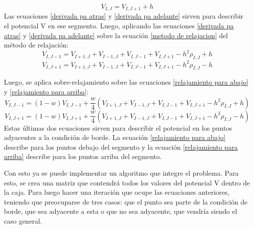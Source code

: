 \documentclass[letterpaper,oneside]{article}
\begin{document}
\begin{equation}
V_{I,J} =V_{I,J+1}+ h
\label{derivada pa adelante}
\end{equation}
Las ecuaciones \ref{derivada pa atras} y \ref{derivada pa adelante} sirven para describir el potencial V en ese segmento. Luego, aplicando las ecuaciones \ref{derivada pa atras} y \ref{derivada pa adelante} sobre la ecuación \ref{metodo de relajacion} del método de relajación:
\begin{equation}
 V_{I,J-1} = V_{I+1,J}+V_{I-1,J}+V_{I,J-1}+V_{I,J+1} - h^2\rho_{I,J} + h
 \label{relajamiento para abajo}
\end{equation}
\begin{equation}
    V_{I,J+1} = V_{I+1,J}+V_{I-1,J}+V_{I,J-1}+V_{I,J+1} - h^2\rho_{I,J}  - h
    \label{relajamiento para arriba}
\end{equation}

Luego, se aplica sobre-relajamiento sobre las ecuaciones \ref{relajamiento para abajo} y \ref{relajamiento para arriba}:
\begin{equation}
    V_{I,J-1} =(1-w)V_{I,J-1}+ \frac{w}{4}(V_{I+1,J}+V_{I-1,J}+V_{I,J-1}+V_{I,J+1} - h^2\rho_{I,J} + h)
\end{equation}
\begin{equation}
    V_{I,J+1} =(1-w)V_{I,J+1} +\frac{w}{4}(V_{I+1,J}+V_{I-1,J}+V_{I,J-1}+V_{I,J+1} - h^2\rho_{I,J}  - h)
\end{equation}
Estas últimas dos ecuaciones sirven para describir el potencial en los puntos adyacentes a la condición de borde. La ecuación \ref{relajamiento para abajo} describe para los puntos debajo del segmento y la ecuación \ref{relajamiento para arriba} describe para los puntos arriba del segmento.

Con esto ya se puede implementar un algoritmo que integre el problema. Para esto, se crea una matriz que contendrá todos los valores del potencial V dentro de la caja. Para luego hacer una iteración que ocupe las ecuaciones anteriores, teniendo que preocuparse de tres casos: que el punto sea parte de la condición de borde, que sea adyacente a esta o que no sea adyacente, que vendría siendo el caso general.
\end{document}
